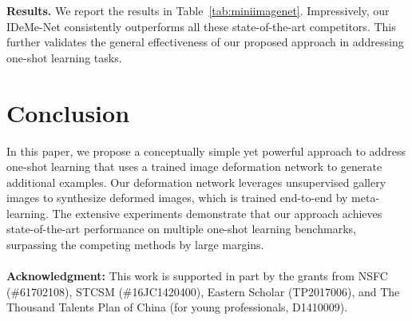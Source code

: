 \documentclass[10pt,letterpaper,twocolumn]{article}
\begin{document}
\noindent \textbf{Results. }We report the results in Table~\ref{tab:miniimagenet}. Impressively, our IDeMe-Net consistently outperforms all these
state-of-the-art competitors. This further validates the general effectiveness
of our proposed approach in addressing one-shot learning tasks.

\section{Conclusion}

In this paper, we propose a conceptually simple yet powerful approach
to address one-shot learning that uses a trained image deformation
network to generate additional examples. Our deformation network leverages
unsupervised gallery images to synthesize deformed images, which is
trained end-to-end by meta-learning. The extensive experiments demonstrate
that our approach achieves state-of-the-art performance on multiple
one-shot learning benchmarks, surpassing the competing methods
by large margins.
\\
\\
\indent \textbf{Acknowledgment:} This work is supported in part by the grants from NSFC (\#61702108),   STCSM (\#16JC1420400), Eastern Scholar (TP2017006), and The Thousand Talents Plan of China (for young professionals, D1410009).

 

\end{document}
